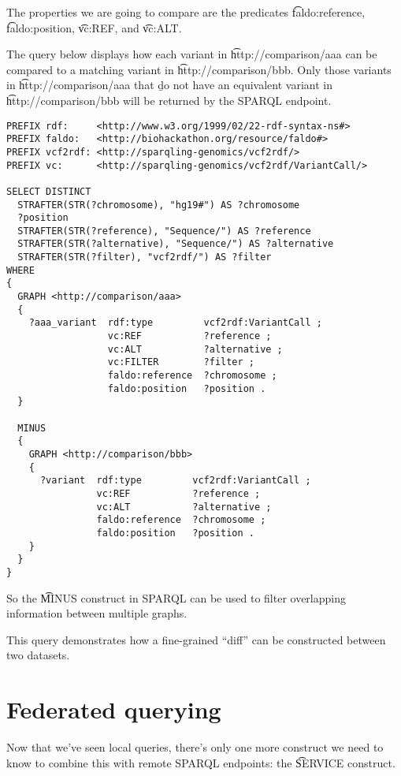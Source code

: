   The properties we are going to compare are the predicates \t{faldo:reference},
  \t{faldo:position}, \t{vc:REF}, and \t{vc:ALT}.

  The query below displays how each variant in \t{http://comparison/aaa}
  can be compared to a matching variant in \t{http://comparison/bbb}.
  Only those variants in \t{http://comparison/aaa} that \b{do not}
  have an equivalent variant in \t{http://comparison/bbb} will be
  returned by the SPARQL endpoint.

\begin{lstlisting}[language=SPARQL]
PREFIX rdf:     <http://www.w3.org/1999/02/22-rdf-syntax-ns#>
PREFIX faldo:   <http://biohackathon.org/resource/faldo#>
PREFIX vcf2rdf: <http://sparqling-genomics/vcf2rdf/>
PREFIX vc:      <http://sparqling-genomics/vcf2rdf/VariantCall/>

SELECT DISTINCT
  STRAFTER(STR(?chromosome), "hg19#") AS ?chromosome
  ?position
  STRAFTER(STR(?reference), "Sequence/") AS ?reference
  STRAFTER(STR(?alternative), "Sequence/") AS ?alternative
  STRAFTER(STR(?filter), "vcf2rdf/") AS ?filter
WHERE
{
  GRAPH <http://comparison/aaa>
  {
    ?aaa_variant  rdf:type         vcf2rdf:VariantCall ;
                  vc:REF           ?reference ;
                  vc:ALT           ?alternative ;
                  vc:FILTER        ?filter ;
                  faldo:reference  ?chromosome ;
                  faldo:position   ?position .
  }

  MINUS
  {
    GRAPH <http://comparison/bbb>
    {
      ?variant  rdf:type         vcf2rdf:VariantCall ;
                vc:REF           ?reference ;
                vc:ALT           ?alternative ;
                faldo:reference  ?chromosome ;
                faldo:position   ?position .
    }
  }
}
\end{lstlisting}

  So the \t{MINUS} construct in SPARQL can be used to filter overlapping
  information between multiple graphs.

  This query demonstrates how a fine-grained ``diff'' can be constructed
  between two datasets.

\section{Federated querying}
\label{sec:federated-querying}

  Now that we've seen local queries, there's only one more construct we need to
  know to combine this with remote SPARQL endpoints: the \t{SERVICE}
  construct.

